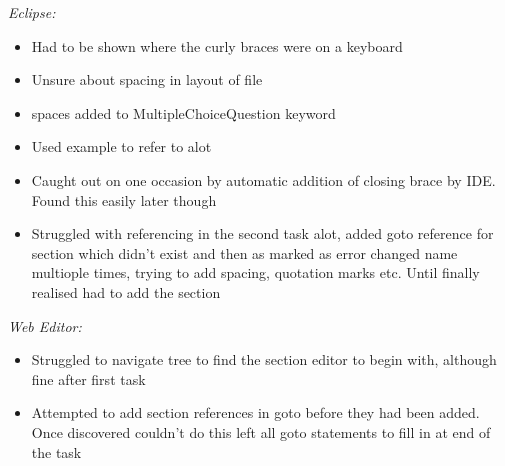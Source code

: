 \documentclass{report}
\begin{document}
\emph{Eclipse:}
\begin{itemize}
\item Had to be shown where the curly braces were on a keyboard
\item Unsure about spacing in layout of file
\item spaces added to MultipleChoiceQuestion keyword
\item Used example to refer to alot
\item Caught out on one occasion by automatic addition of closing brace by IDE. Found this easily later though
\item Struggled with referencing in the second task alot, added goto reference for section which didn't exist and then as marked as error changed name multiople times, trying to add spacing, quotation marks etc. Until finally realised had to add the section
\end{itemize}
\emph{Web Editor:}
\begin{itemize}
\item Struggled to navigate tree to find the section editor to begin with, although fine after first task
\item Attempted to add section references in goto before they had been added. Once discovered couldn't do this left all goto statements to fill in at end of the task
\end{itemize}
\end{document}
